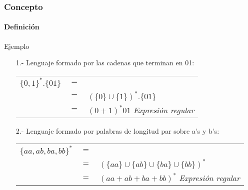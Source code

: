 \documentclass{beamer}
\begin{document}
		\begin{frame}
			\frametitle{Concepto}
			\framesubtitle{Definici\'on}

			\begin{exampleblock}{Ejemplo}
			    \begin{itemize}
			        \item[1.-] Lenguaje formado por las cadenas que terminan en 01:
			        \begin{table}[H]
			            \begin{center}
			                \begin{tabular}{ccl}
			                    $\{0,1\}^{*}.\{01\}$ & $=$ & \\
			                    & $=$ & $(\{0\} \cup \{1\})^{*}.\{01\}$  \\
			                    & $=$ & $(0+1)^{*}01$ \emph{Expresi\'on regular}
			                \end{tabular}
			            \end{center}
			        \end{table}
			        \item[2.-] Lenguaje formado por palabras de longitud par sobre a's y b's:
			        \begin{table}[H]
			            \begin{center}
			                \begin{tabular}{ccl}
			                    $\{aa,ab,ba,bb\}^{*}$ & $=$ & \\
			                    & $=$ & $(\{aa\} \cup \{ab\} \cup \{ba\} \cup \{bb\})^{*}$  \\
			                    & $=$ & $(aa+ab+ba+bb)^{*}$ \emph{Expresi\'on regular}
			                \end{tabular}
			            \end{center}
			        \end{table}
			    \end{itemize}
			\end{exampleblock}
		\end{frame}
\end{document}

